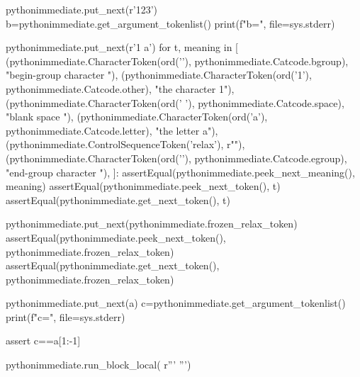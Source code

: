 \documentclass[a5paper]{article}
\begin{document}
\begin{pycode}
	pythonimmediate.put_next(r'{123}')
	b=pythonimmediate.get_argument_tokenlist()
	print(f"{b=}", file=sys.stderr)

	pythonimmediate.put_next(r'{1 a\relax}')
	for t, meaning in [
			(pythonimmediate.CharacterToken(ord('{'), pythonimmediate.Catcode.bgroup), "begin-group character {"),
			(pythonimmediate.CharacterToken(ord('1'), pythonimmediate.Catcode.other), "the character 1"),
			(pythonimmediate.CharacterToken(ord(' '), pythonimmediate.Catcode.space), "blank space  "),
			(pythonimmediate.CharacterToken(ord('a'), pythonimmediate.Catcode.letter), "the letter a"),
			(pythonimmediate.ControlSequenceToken('relax'), r"\relax"),
			(pythonimmediate.CharacterToken(ord('}'), pythonimmediate.Catcode.egroup), "end-group character }"),
			]:
		assertEqual(pythonimmediate.peek_next_meaning(), meaning)
		assertEqual(pythonimmediate.peek_next_token(), t)
		assertEqual(pythonimmediate.get_next_token(), t)

	pythonimmediate.put_next(pythonimmediate.frozen_relax_token)
	assertEqual(pythonimmediate.peek_next_token(), pythonimmediate.frozen_relax_token)
	assertEqual(pythonimmediate.get_next_token(), pythonimmediate.frozen_relax_token)

	pythonimmediate.put_next(a)
	c=pythonimmediate.get_argument_tokenlist()
	print(f"{c=}", file=sys.stderr)

	assert c==a[1:-1]

pythonimmediate.run_block_local(
r'''
''')
\end{pycode}
\end{document}
